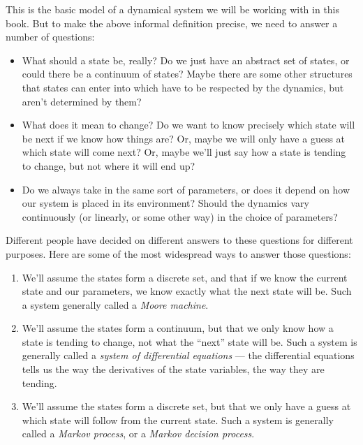 \documentclass[DynamicalBook]{subfiles}
\begin{document}
This is the basic model of a dynamical system we will be working with in this
book. But to make the above informal definition precise, we need to answer
a number of questions:
\begin{itemize}
  \item What should a state be, really? Do we just have an abstract set of
    states, or could there be a continuum of states? Maybe there are some other
    structures that states can enter into which have to be respected by the
    dynamics, but aren't determined by them? 
  \item What does it mean to change? Do we want to know precisely which state
    will be next if we know how things are? Or, maybe we will only have a guess
    at which state will come next? Or, maybe we'll just say how a state is
    tending to change, but not where it will end up?
  \item Do we always take in the same sort of parameters, or does it depend on
    how our system is placed in its environment? Should the dynamics vary
    continuously (or linearly, or some other way) in the choice of parameters? 
\end{itemize}

Different people have decided on different answers to these questions for
different purposes. Here are some of the most widespread ways to answer those
questions:
\begin{enumerate}
  \item We'll assume the states form a discrete set, and that if we know the
    current state and our parameters, we know exactly what the next state will
    be. Such a system generally called a \emph{Moore machine}.
  \item We'll assume the states form a continuum, but that we only know how a
    state is tending to change, not what the ``next'' state will be. Such a
    system is generally called a \emph{system of
      differential equations} --- the differential equations tells us the way the
    derivatives of the state variables, the way they are tending.
  \item We'll assume the states form a discrete set, but that we only have a
    guess at which state will follow from the current state. Such a system is generally
    called a \emph{Markov process}, or a \emph{Markov decision process}.
\end{enumerate}
\end{document}
